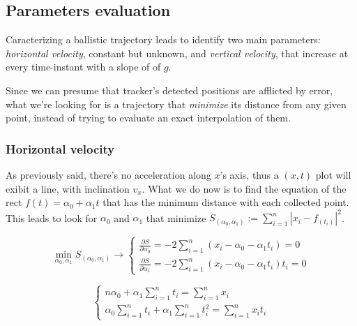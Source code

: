 \documentclass[notitlepage,a4paper,11pt]{article} %
\begin{document}
	\subsection{Parameters evaluation}

		Caracterizing a ballistic trajectory leads to identify two main parameters: \emph{horizontal velocity}, constant but unknown, and \emph{vertical velocity}, that increase at every time-instant with a slope of of $g$.

		Since we can presume that tracker's detected positions are afflicted by error, what we're looking for is a trajectory that \emph{minimize} its distance from any given point, instead of trying to evaluate an exact interpolation of them.

		\subsubsection{Horizontal velocity}
			As previously said, there's no acceleration along $x$'s axis, thus a $(x,t)$ plot will exibit a line, with inclination $v_x$.
			What we do now is to find the equation of the rect $f(t) = \alpha_0 + \alpha_1 t$ that has the minimum distance with each collected point.
			This leads to look for $\alpha_0$ and $\alpha_1$ that minimize $ S_{(\alpha_0, \alpha_1)} := \sum_{i=1}^n | x_i - f_{(t_i)} |^2 $.

			\begin{equation}
				\min_{\alpha_0, \alpha_1} S_{(\alpha_0, \alpha_1)} \to
				\begin{cases}
					\frac{\partial S}{\partial \alpha_0} = -2 \sum_{i=1}^n (x_i - \alpha_0 - \alpha_1 t_i) = 0 \\
					\frac{\partial S}{\partial \alpha_1} = -2 \sum_{i=1}^n (x_i - \alpha_0 - \alpha_1 t_i) t_i = 0
				\end{cases}
			\end{equation}

			\begin{equation} \label{partder}
				\begin{cases}
					n \alpha_0 + \alpha_1 \sum_{i=1}^n t_i = \sum_{i=1}^n x_i \\
					\alpha_0 \sum_{i=1}^n t_i + \alpha_1 \sum_{i=1}^n t_i^2 = \sum_{i=1}^n x_i t_i
				\end{cases}
			\end{equation}
\end{document}
